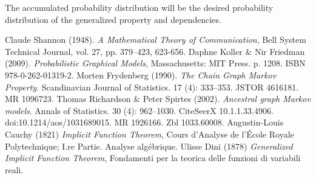 \documentclass[a4paper, 11pt, oneside]{book}
\begin{document}
The accumulated probability distribution will be the desired probability distribution of the generalized property and dependencies.


\begin{thebibliography}{unsrt}
    Claude Shannon (1948). \emph{A Mathematical Theory of Communication}, Bell System Technical Journal, vol. 27, pp. 379–423, 623-656.
    Daphne Koller \& Nir Friedman (2009). \emph{Probabilistic Graphical Models}, Massachusetts: MIT Press. p. 1208. ISBN 978-0-262-01319-2.
    Morten Frydenberg (1990). \emph{The Chain Graph Markov Property}. Scandinavian Journal of Statistics. 17 (4): 333–353. JSTOR 4616181. MR 1096723.
    Thomas Richardson \& Peter Spirtes (2002). \emph{Ancestral graph Markov models}. Annals of Statistics. 30 (4): 962–1030. CiteSeerX 10.1.1.33.4906. doi:10.1214/aos/1031689015. MR 1926166. Zbl 1033.60008.
    Augustin-Louis Cauchy (1821) \emph{Implicit Function Theorem}, Cours d'Analyse de l’École Royale Polytechnique; I.re Partie. Analyse algébrique.
    Ulisse Dini (1878) \emph{Generalized Implicit Function Theorem}, Fondamenti per la teorica delle funzioni di variabili reali.
\end{thebibliography}
\end{document}
